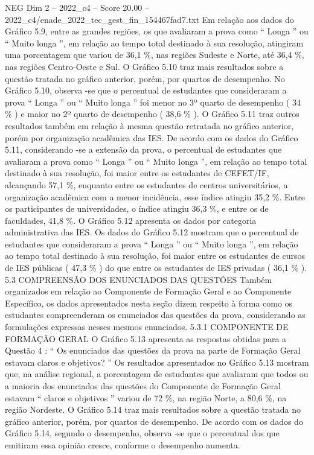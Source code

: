 \begin{textsample}{NEG Dim 2 – 2022\_c4 – Score 20.00 – 2022\_c4/enade\_2022\_tec\_gest\_fin\_154467fad7.txt}
Em relação aos dados do Gráfico 5.9, entre as grandes regiões, os que avaliaram a prova como “ Longa ” ou “ Muito longa ”, em relação ao tempo total destinado à sua resolução, atingiram uma porcentagem que variou de 36,1 \%, nas regiões Sudeste e Norte, até 36,4 \%, nas regiões Centro-Oeste e Sul.
O Gráfico 5.10 traz mais resultados sobre a questão tratada no gráfico anterior, porém, por quartos de desempenho.
No Gráfico 5.10, observa -se que o percentual de estudantes que consideraram a prova “ Longa ” ou “ Muito longa ” foi menor no 3º quarto de desempenho ( 34 \% ) e maior no 2º quarto de desempenho ( 38,6 \% ).
O Gráfico 5.11 traz outros resultados também em relação à mesma questão retratada no gráfico anterior, porém por organização acadêmica das IES.
De acordo com os dados do Gráfico 5.11, considerando -se a extensão da prova, o percentual de estudantes que avaliaram a prova como “ Longa ” ou “ Muito longa ”, em relação ao tempo total destinado à sua resolução, foi maior entre os estudantes de CEFET/IF, alcançando 57,1 \%, enquanto entre os estudantes de centros universitários, a organização acadêmica com a menor incidência, esse índice atingiu 35,2 \%.
Entre os participantes de universidades, o índice atingiu 36,3 \%, e entre os de faculdades, 41,8 \%.
O Gráfico 5.12 apresenta os dados por categoria administrativa das IES.
Os dados do Gráfico 5.12 mostram que o percentual de estudantes que consideraram a prova “ Longa ” ou “ Muito longa ”, em relação ao tempo total destinado à sua resolução, foi maior entre os estudantes de cursos de IES públicas ( 47,3 \% ) do que entre os estudantes de IES privadas ( 36,1 \% ). 5.3 COMPREENSÃO DOS ENUNCIADOS DAS QUESTÕES Também organizados em relação ao Componente de Formação Geral e ao Componente Específico, os dados apresentados nesta seção dizem respeito à forma como os estudantes compreenderam os enunciados das questões da prova, considerando as formulações expressas nesses mesmos enunciados. 5.3.1 COMPONENTE DE FORMAÇÃO GERAL O Gráfico 5.13 apresenta as respostas obtidas para a Questão 4 : “ Os enunciados das questões da prova na parte de Formação Geral estavam claros e objetivos? ” Os resultados apresentados no Gráfico 5.13 mostram que, na análise regional, a porcentagem de estudantes que avaliaram que todos ou a maioria dos enunciados das questões do Componente de Formação Geral estavam “ claros e objetivos ” variou de 72 \%, na região Norte, a 80,6 \%, na região Nordeste.
O Gráfico 5.14 traz mais resultados sobre a questão tratada no gráfico anterior, porém, por quartos de desempenho.
De acordo com os dados do Gráfico 5.14, segundo o desempenho, observa -se que o percentual dos que emitiram essa opinião cresce, conforme o desempenho aumenta.

\end{textsample}
